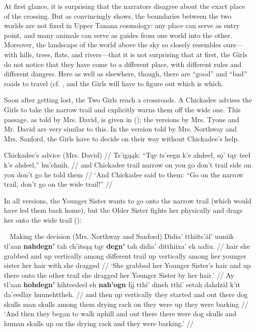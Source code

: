 At first glance, it is surprising that the narrators disagree about the exact place of the crossing. But as \citet[470f.]{GuedonMF2005} convincingly shows, the boundaries between the two worlds are not fixed in Upper Tanana cosmology: any place can serve as entry point, and many animals can serve as guides from one world into the other. Moreover, the landscape of the world above the sky so closely resembles ours—with hills, trees, flats, and rivers—that it is not surprising that at first, the Girls do not notice that they have come to a different place, with different rules and different dangers. Here as well as elsewhere, though, there are ``good'' and ``bad'' roads to travel (cf. \citet[473]{GuedonMF2005}, and the Girls will have to figure out which is which.

Soon after getting lost, the Two Girls reach a crossroads. A Chickadee advises the Girls to take the narrow trail and explicitly warns them off the wide one. This passage, as told by Mrs. David, is given in (); the versions by Mrs. Tyone and Mr. David are very similar to this. In the version told by Mrs. Northway and Mrs. Sanford, the Girls have to decide on their way without Chickadee's help.

\ex
\begingl
\glpreamble Chickadee's advice (Mrs. David)  //
 Ts'igąąk: ``Tąy ts'eegn k'e ahdeeł, sǫ' tąy teeł k'e ahdeel,'' hu'ehnih. //
\glb and Chickadee trail narrow on {you go} don't trail side on {you don't go} {he told them} //
\glft `And Chickadee said to them: ``Go on the narrow trail, don't go on the wide trail!'' //
\endgl
\xe

In all versions, the Younger Sister wants to go onto the narrow trail (which would have led them back home), but the Older Sister fights her physically and drags her onto the wide trail ():

\pex~ Making the decision (Mrs. Northway and Sanford) 
\a
\begingl
\gla Didia' tthiits'äl' uuniik tl'aan \textbf{nahdegn'} tah ch'itsąą tąy \textbf{degn'} tah didia' ditthiixa' eh aałiu.  //
 hair {she grabbed} and {up vertically} among different trail {up vertically} among {her younger sister} {her hair} with {she dragged} //
\glft `She grabbed her Younger Sister's hair and up there onto the other trail she dragged her Younger Sister by her hair.' //
\endgl
\a
\begingl
\gla Ay tl'aan \textbf{hohdegn'} hihteedeel eh \textbf{nah'ogn} łįį tthi' dineh tthi' eetah dahdzäl k'it da'eedlay huunehttheh.  //
\glb and then {up vertically} {they started} and {out there} dog skulls man skulls {among them} {drying rack} on {they were up} {they were barking} //
\glft `And then they began to walk uphill and out there there were dog skulls and human skulls up on the drying rack and they were barking.'   //
\endgl
\xe

